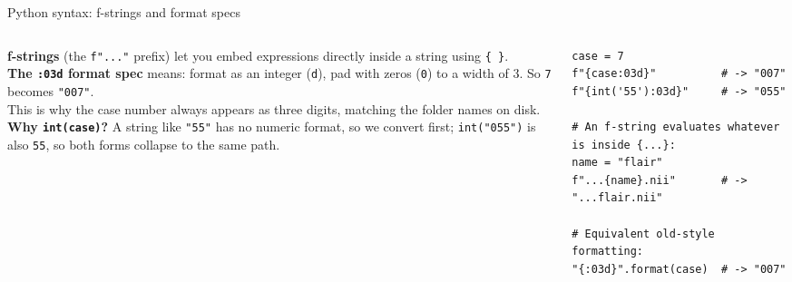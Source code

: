 \documentclass[10pt,aspectratio=169]{beamer}
\renewcommand{\section}[2][]{}
\begin{document}
\begin{frame}[fragile]{Python syntax: f-strings and format specs}
\begin{columns}[T,onlytextwidth]
\begin{column}{0.42\textwidth}
\small
\textbf{f-strings} (the \texttt{f"..."} prefix) let you embed expressions directly inside a string
using \texttt{\{\,\}}.\\[0.4em]
\textbf{The \texttt{:03d} format spec} means: format as an integer (\texttt{d}), pad with zeros
(\texttt{0}) to a width of 3. So \texttt{7} becomes \texttt{"007"}.\\[0.4em]
This is why the case number always appears as three digits, matching the folder names on disk.\\[0.4em]
\textbf{Why \texttt{int(case)}?} A string like \texttt{"55"} has no numeric format, so we convert
first; \texttt{int("055")} is also \texttt{55}, so both forms collapse to the same path.
\end{column}
\begin{column}{0.56\textwidth}
\begin{lstlisting}[stepnumber=0]
case = 7
f"{case:03d}"          # -> "007"
f"{int('55'):03d}"     # -> "055"

# An f-string evaluates whatever is inside {...}:
name = "flair"
f"...{name}.nii"       # -> "...flair.nii"

# Equivalent old-style formatting:
"{:03d}".format(case)  # -> "007"
\end{lstlisting}
\end{column}
\end{columns}
\end{frame}

\section{Loading and scaling}
\end{document}
